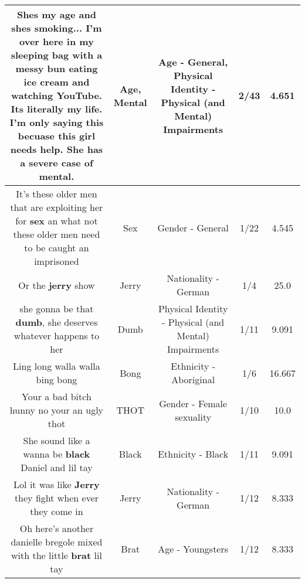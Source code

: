 \documentclass[11pt]{article}
\newlength\mylength
\begin{document}
\begin{center}
\begin{longtable}{|C{.65\mylength}|C{.30\mylength}|C{.12\mylength}|C{.12\mylength}|C{.12\mylength}|}
  \small Shes my \textbf{age} and shes smoking... I'm over here in my sleeping bag with a messy bun eating ice cream and watching YouTube. Its literally my life. I'm only saying this becuase this girl needs help. She has a severe case of \textbf{mental}.\normalsize   & Age, Mental & Age - General, Physical Identity - Physical (and Mental) Impairments & 2/43 & 4.651 \\  \hline
  \small It's these older men that are exploiting her for \textbf{sex} an what not these older men need to be caught an imprisoned\normalsize   & Sex & Gender - General & 1/22 & 4.545 \\  \hline
  \small Or the \textbf{jerry} show\normalsize   & Jerry & Nationality - German & 1/4 & 25.0 \\  \hline
  \small she gonna be that \textbf{dumb}, she deserves whatever happens to her\normalsize   & Dumb & Physical Identity - Physical (and Mental) Impairments & 1/11 & 9.091 \\  \hline
  \small Ling long walla walla bing bong\normalsize   & Bong & Ethnicity - Aboriginal & 1/6 & 16.667 \\  \hline
  \small Your a bad bitch hunny no your an ugly thot\normalsize   & THOT & Gender - Female sexuality & 1/10 & 10.0 \\  \hline
  \small She sound like a wanna be \textbf{black} Daniel and lil tay\normalsize   & Black & Ethnicity - Black & 1/11 & 9.091 \\  \hline
  \small Lol it was like \textbf{Jerry} they fight when ever they come in\normalsize   & Jerry & Nationality - German & 1/12 & 8.333 \\  \hline
  \small Oh here's another danielle bregole mixed with the little \textbf{brat} lil tay\normalsize   & Brat & Age - Youngsters & 1/12 & 8.333 \\  \hline

\end{longtable}
\end{center}
\end{document}
